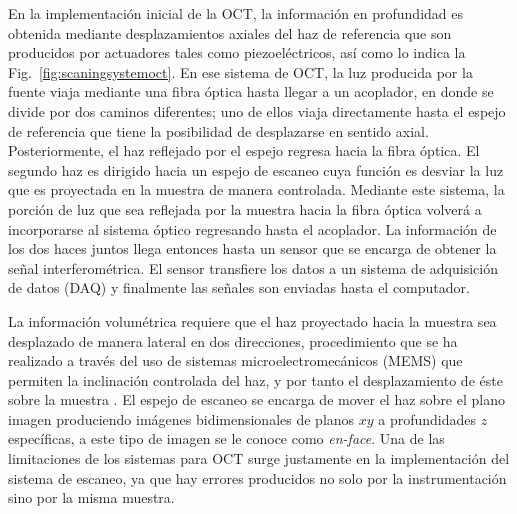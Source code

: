 

En la implementación inicial de la OCT, la información en profundidad es obtenida mediante desplazamientos axiales del haz de referencia que son producidos por actuadores tales como piezoeléctricos, así como lo indica la Fig.~\ref{fig:scaningsystemoct}. En ese sistema de OCT, la luz producida por la fuente viaja mediante una fibra óptica hasta llegar a un acoplador, en donde se divide por dos caminos diferentes; uno de ellos viaja directamente hasta el espejo de referencia que tiene la posibilidad de desplazarse en sentido axial. Posteriormente, el haz reflejado por el espejo regresa hacia la fibra óptica. El segundo haz es dirigido hacia un espejo de escaneo cuya función es desviar la luz que es proyectada en la muestra de manera controlada. Mediante este sistema, la porción de luz que sea reflejada por la muestra hacia la fibra óptica volverá a incorporarse al sistema óptico regresando hasta el acoplador. La información de los dos haces juntos llega entonces hasta un sensor que se encarga de obtener la señal interferométrica. El sensor transfiere los datos a un sistema de adquisición de datos (DAQ) y finalmente las señales son enviadas hasta el computador. 

La información volumétrica requiere que el haz proyectado hacia la muestra sea desplazado de manera lateral en dos direcciones, procedimiento que se ha realizado a través del uso de sistemas microelectromecánicos (MEMS) que permiten la inclinación controlada del haz, y por tanto el desplazamiento de éste sobre la muestra \cite{Zara2003,Jung2006,Aguirre2007}. El espejo de escaneo se encarga de mover el haz sobre el plano imagen produciendo imágenes bidimensionales de planos $xy$ a profundidades $z$ específicas, a este tipo de imagen se le conoce como \emph{en-face}. Una de las limitaciones de los sistemas para OCT surge justamente en la implementación del sistema de escaneo, ya que hay errores producidos no solo por la instrumentación sino por la misma muestra. 

